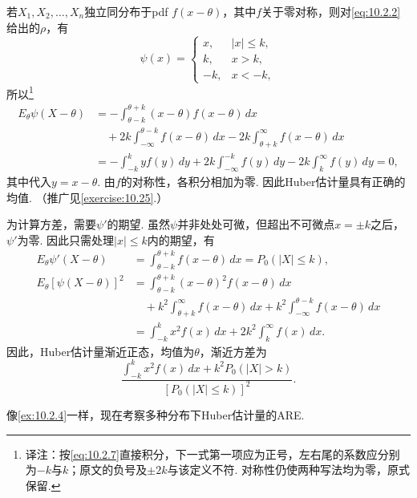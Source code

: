 \begin{example}[Huber估计量的极限分布]\label{ex:10.2.6}
若$X_1,X_2,\ldots,X_n$独立同分布于pdf $f(x-\theta)$，其中$f$关于零对称，则对\eqref{eq:10.2.2}给出的$\rho$，有
\begin{equation}\label{eq:10.2.7}
\psi(x)=\begin{cases}x,&|x|\leq k,\\k,&x>k,\\-k,&x<-k,\end{cases}
\end{equation}
所以\footnote{译注：按\eqref{eq:10.2.7}直接积分，下一式第一项应为正号，左右尾的系数应分别为$-k$与$k$；原文的负号及$\pm2k$与该定义不符. 对称性仍使两种写法均为零，原式保留.}
\begin{equation}\label{eq:10.2.8}
\begin{aligned}
E_\theta\psi(X-\theta)
&=-\int_{\theta-k}^{\theta+k}(x-\theta)f(x-\theta)\,dx\\
&\quad+2k\int_{-\infty}^{\theta-k}f(x-\theta)\,dx-2k\int_{\theta+k}^\infty f(x-\theta)\,dx\\
&=-\int_{-k}^kyf(y)\,dy+2k\int_{-\infty}^{-k}f(y)\,dy-2k\int_k^\infty f(y)\,dy=0,
\end{aligned}
\end{equation}
其中代入$y=x-\theta$. 由$f$的对称性，各积分相加为零. 因此Huber估计量具有正确的均值. （推广见\autoref{exercise:10.25}.）

为计算方差，需要$\psi'$的期望. 虽然$\psi$并非处处可微，但超出不可微点$x=\pm k$之后，$\psi'$为零. 因此只需处理$|x|\leq k$内的期望，有
$$\begin{aligned}
E_\theta\psi'(X-\theta)&=\int_{\theta-k}^{\theta+k}f(x-\theta)\,dx=P_0(|X|\leq k),\\
E_\theta[\psi(X-\theta)]^2
&=\int_{\theta-k}^{\theta+k}(x-\theta)^2f(x-\theta)\,dx\\
&\quad+k^2\int_{\theta+k}^\infty f(x-\theta)\,dx+k^2\int_{-\infty}^{\theta-k}f(x-\theta)\,dx\\
&=\int_{-k}^kx^2f(x)\,dx+2k^2\int_k^\infty f(x)\,dx.
\end{aligned}$$
因此，Huber估计量渐近正态，均值为$\theta$，渐近方差为
$$\frac{\int_{-k}^kx^2f(x)\,dx+k^2P_0(|X|>k)}{[P_0(|X|\leq k)]^2}.$$
\end{example}

像\autoref{ex:10.2.4}一样，现在考察多种分布下Huber估计量的ARE.

